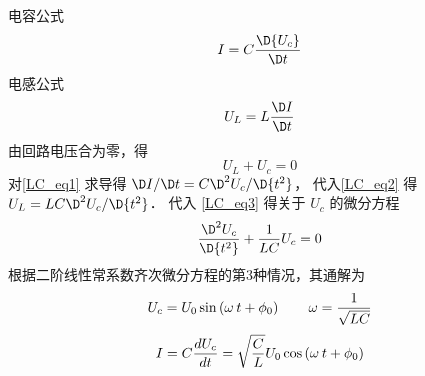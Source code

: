
电容公式
\begin{equation}\label{LC_eq1}
I = C\frac{\D {U_c}}{\D t}
\end{equation}
电感公式
\begin{equation}\label{LC_eq2}
{U_L} = L\frac{\D I}{\D t}
\end{equation}
由回路电压合为零，得
\begin{equation}\label{LC_eq3}
{U_L} + {U_c} = 0
\end{equation}
对\autoref{LC_eq1} 求导得 ${\D I}/{\D t} = C{{\D^2}{U_c}}/{\D{t^2}}$， 代入\autoref{LC_eq2} 得 ${U_L} = LC {{\D^2}{U_c}}/{\D{t^2}}$． 代入  \autoref{LC_eq3}  得关于 ${U_c}$ 的微分方程
\begin{equation}
\frac{{\D^2}{U_c}}{\D{t^2}} + \frac{1}{LC}{U_c} = 0
\end{equation}
根据二阶线性常系数齐次微分方程的第3种情况，其通解为
\begin{equation}
{U_c} = {U_0}\sin \left( {\omega {\kern 1pt} {\kern 1pt} t + {\phi_0}} \right)
\qquad
\omega  = \frac{1}{\sqrt {LC} }
\end{equation}
\begin{equation}
I = C\frac{d{U_c}}{dt} = \sqrt {\frac{C}{L}} {U_0}\cos \left( {\omega {\kern 1pt} {\kern 1pt} t + {\phi_0}} \right)
\end{equation}
 
